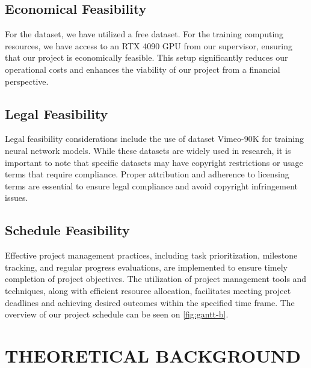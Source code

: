 \documentclass{ioereport}
\begin{document}
    \subsection{Economical Feasibility}
    For the dataset, we have utilized a free dataset. For the training computing resources, we have access to an RTX 4090 GPU from our supervisor, ensuring that our project is economically feasible. This setup significantly reduces our operational costs and enhances the viability of our project from a financial perspective.
    \subsection{Legal Feasibility}
    Legal feasibility considerations include the use of dataset Vimeo-90K for training neural network models. While these datasets are widely used in research, it is important to note that specific datasets may have copyright restrictions or usage terms that require compliance. Proper attribution and adherence to licensing terms are essential to ensure legal compliance and avoid copyright infringement issues.
    \subsection{Schedule Feasibility}
    Effective project management practices, including task prioritization, milestone tracking, and regular progress evaluations, are implemented to ensure timely completion of project objectives. The utilization of project management tools and techniques, along with efficient resource allocation, facilitates meeting project deadlines and achieving desired outcomes within the specified time frame. The overview of our project schedule can be seen on \autoref{fig:gantt-b}.
\pagebreak

\section{\MakeUppercase{Theoretical Background}}
\end{document}
